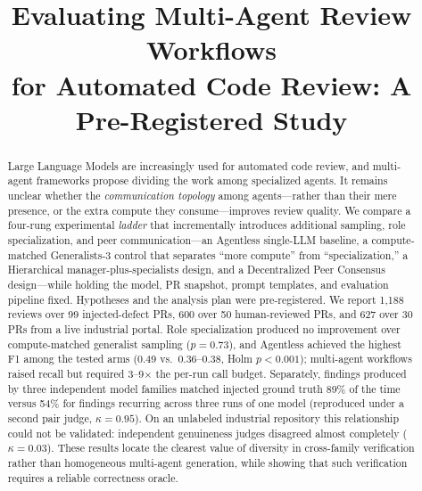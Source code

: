 \documentclass[conference]{IEEEtran}
\begin{document}
\title{Evaluating Multi-Agent Review Workflows\\
for Automated Code Review: A Pre-Registered Study}

\author{
}

\maketitle

\begin{abstract}
Large Language Models are increasingly used for automated code review, and
multi-agent frameworks propose dividing the work among specialized agents. It
remains unclear whether the \emph{communication topology} among agents---rather
than their mere presence, or the extra compute they consume---improves review
quality. We compare a four-rung experimental \emph{ladder} that incrementally
introduces additional sampling, role specialization, and peer communication---an
Agentless single-LLM baseline, a compute-matched Generalists-3 control that
separates ``more compute'' from ``specialization,'' a Hierarchical
manager-plus-specialists design, and a Decentralized Peer Consensus
design---while holding the model, PR snapshot, prompt templates, and evaluation
pipeline fixed. Hypotheses and the analysis plan were pre-registered. We report
1{,}188 reviews over 99 injected-defect PRs, 600 over 50 human-reviewed PRs, and
627 over 30 PRs from a live industrial portal. Role specialization produced no
improvement over compute-matched generalist sampling ($p{=}0.73$), and Agentless
achieved the highest F1 among the tested arms (0.49 vs.\ 0.36--0.38, Holm
$p{<}0.001$); multi-agent workflows raised recall but required 3--9$\times$ the
per-run call budget. Separately, findings produced by three independent model
families matched injected ground truth 89\% of the time versus 54\% for findings
recurring across three runs of one model (reproduced under a second pair judge,
$\kappa{=}0.95$). On an unlabeled industrial repository this relationship could
not be validated: independent genuineness judges disagreed almost completely
($\kappa{=}0.03$). These results locate the clearest value of diversity in
cross-family verification rather than homogeneous multi-agent generation, while
showing that such verification requires a reliable correctness oracle.
\end{abstract}
\end{document}
